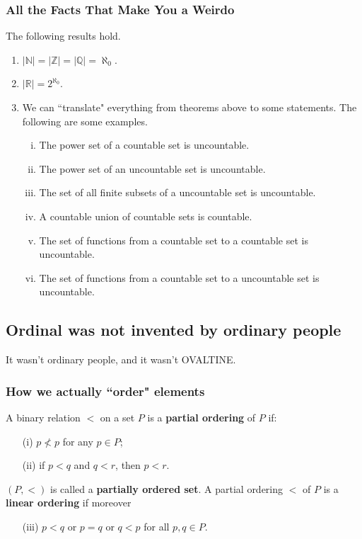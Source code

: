 \subsubsection{All the Facts That Make You a Weirdo}
The following results hold.
	\begin{enumerate}[(1)]
		\item $ |\mathbb{N}| = |\mathbb{Z}| = |\mathbb{Q}| = \aleph_0 $.
		\item $|\mathbb{R}| = 2^{\aleph_0}$.
		\item We can ``translate" everything from theorems above to some statements. The following are some examples.
		\begin{enumerate}[(i)]
			\item The power set of a countable set is uncountable.
			\item The power set of an uncountable set is uncountable.
			\item The set of all finite subsets of a uncountable set is uncountable.
			\item A countable union of countable sets is countable.
			\item The set of functions from a countable set to a countable set is uncountable.
			\item The set of functions from a countable set to a uncountable set is uncountable.
		\end{enumerate} 
	\end{enumerate}
	
\subsection{Ordinal was not invented by ordinary people}
It wasn't ordinary people, and it wasn't OVALTINE.
\subsubsection{How we actually ``order" elements}
\begin{definition}
	A binary relation $<$ on a set $P$ is a \textbf{partial ordering} of $P$ if:
	\begin{enumerate}
		\item[(i)] $p \not< p$ for any $p \in P$;
		\item[(ii)] if $p < q$ and $q < r$, then $p < r$.
	\end{enumerate}
	$(P,<)$ is called a \textbf{partially ordered set}. A partial ordering $<$ of $P$ is a \textbf{linear ordering} if moreover
	\begin{enumerate}
		\item[(iii)] $p < q$ or $p = q$ or $q < p$ for all $p, q \in P$.
	\end{enumerate}
\end{definition}
